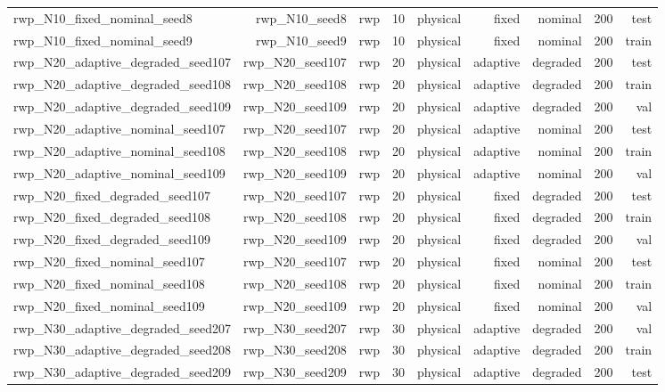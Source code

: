 \begin{tabular}{lrrrrrrrr}
rwp\_N10\_fixed\_nominal\_seed8 & rwp\_N10\_seed8 & rwp & 10 & physical & fixed & nominal & 200 & test \\
rwp\_N10\_fixed\_nominal\_seed9 & rwp\_N10\_seed9 & rwp & 10 & physical & fixed & nominal & 200 & train \\
rwp\_N20\_adaptive\_degraded\_seed107 & rwp\_N20\_seed107 & rwp & 20 & physical & adaptive & degraded & 200 & test \\
rwp\_N20\_adaptive\_degraded\_seed108 & rwp\_N20\_seed108 & rwp & 20 & physical & adaptive & degraded & 200 & train \\
rwp\_N20\_adaptive\_degraded\_seed109 & rwp\_N20\_seed109 & rwp & 20 & physical & adaptive & degraded & 200 & val \\
rwp\_N20\_adaptive\_nominal\_seed107 & rwp\_N20\_seed107 & rwp & 20 & physical & adaptive & nominal & 200 & test \\
rwp\_N20\_adaptive\_nominal\_seed108 & rwp\_N20\_seed108 & rwp & 20 & physical & adaptive & nominal & 200 & train \\
rwp\_N20\_adaptive\_nominal\_seed109 & rwp\_N20\_seed109 & rwp & 20 & physical & adaptive & nominal & 200 & val \\
rwp\_N20\_fixed\_degraded\_seed107 & rwp\_N20\_seed107 & rwp & 20 & physical & fixed & degraded & 200 & test \\
rwp\_N20\_fixed\_degraded\_seed108 & rwp\_N20\_seed108 & rwp & 20 & physical & fixed & degraded & 200 & train \\
rwp\_N20\_fixed\_degraded\_seed109 & rwp\_N20\_seed109 & rwp & 20 & physical & fixed & degraded & 200 & val \\
rwp\_N20\_fixed\_nominal\_seed107 & rwp\_N20\_seed107 & rwp & 20 & physical & fixed & nominal & 200 & test \\
rwp\_N20\_fixed\_nominal\_seed108 & rwp\_N20\_seed108 & rwp & 20 & physical & fixed & nominal & 200 & train \\
rwp\_N20\_fixed\_nominal\_seed109 & rwp\_N20\_seed109 & rwp & 20 & physical & fixed & nominal & 200 & val \\
rwp\_N30\_adaptive\_degraded\_seed207 & rwp\_N30\_seed207 & rwp & 30 & physical & adaptive & degraded & 200 & val \\
rwp\_N30\_adaptive\_degraded\_seed208 & rwp\_N30\_seed208 & rwp & 30 & physical & adaptive & degraded & 200 & train \\
rwp\_N30\_adaptive\_degraded\_seed209 & rwp\_N30\_seed209 & rwp & 30 & physical & adaptive & degraded & 200 & test \\

\end{tabular}
